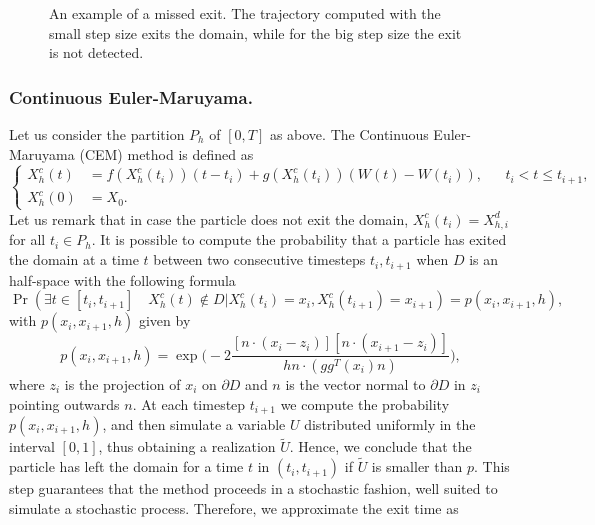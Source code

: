\begin{figure}[t]
    \centering
    \resizebox{0.6\linewidth}{!}{ }  
    \caption{An example of a missed exit. The trajectory computed with the small step size exits the domain, while for the big step size the exit is not detected.}
    \label{fig:MissedExit}
\end{figure}
 
\subsubsection{Continuous Euler-Maruyama. }
Let us consider the partition $P_h$ of $[0,T]$ as above. The Continuous Euler-Maruyama (CEM) method is defined as
\begin{equation}\label{eq:CEM}
	\left \{
	\begin{aligned}
		X_h^c(t) &= f(X_h^c(t_i))(t-t_i) + g(X_h^c(t_i))(W(t) - W(t_{i})),  && t_i < t \leq t_{i+1},\\
		X_h^c(0) &= X_0.
	\end{aligned} \right .
\end{equation} 
Let us remark that in case the particle does not exit the domain, $X_h^c(t_i) = X_{h,i}^d$ for all $t_i \in P_h$. It is possible to compute the probability that a particle has exited the domain at a time $t$ between two consecutive timesteps $t_i,t_{i+1}$ when $D$ is an half-space with the following formula \cite{Gobet2001}
\begin{equation}\label{eq:CEMProb}
	\Pr (\exists t \in [ t_i,t_{i+1} ] \quad X_h^c(t) \notin D | X_h^c(t_i) = x_i, X_h^c(t_{i+1}) = x_{i+1}) = p(x_i,x_{i+1},h),
\end{equation}
with $p(x_i,x_{i+1},h)$ given by
\begin{equation}\label{eq:CEMProbHalfSpace}
	p(x_i,x_{i+1},h) = \exp\Big(-2\frac{[n\cdot(x_i - z_i)][n\cdot(x_{i+1} - z_i)]}{hn\cdot (gg^T(x_i)n)}\Big),
\end{equation}
where $z_i$ is the projection of $x_i$ on $\partial D$ and $n$ is the vector normal to $\partial D$ in $z_i$ pointing outwards $n$. At each timestep $t_{i+1}$ we compute the probability $p(x_i,x_{i+1},h)$, and then simulate a variable $U$ distributed uniformly in the interval $\left[0,1\right]$, thus obtaining a realization $\tilde U$. Hence, we conclude that the particle has left the domain for a time $t$ in $(t_i,t_{i+1})$ if $\tilde U$ is smaller than $p$. This step guarantees that the method proceeds in a stochastic fashion, well suited to simulate a stochastic process. Therefore, we approximate the exit time as
